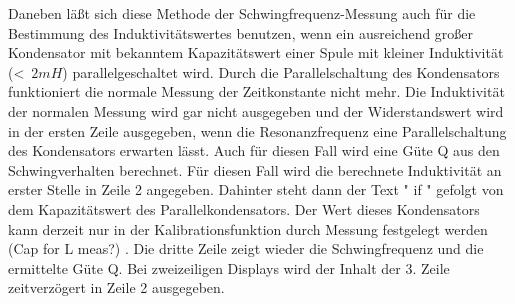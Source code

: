 Daneben läßt sich diese Methode der Schwingfrequenz-Messung auch für die Bestimmung des Induktivitätswertes benutzen,
wenn ein ausreichend großer Kondensator mit bekanntem Kapazitätswert einer Spule mit kleiner Induktivität (\textless~\(2mH\))
parallelgeschaltet wird. Durch die Parallelschaltung des Kondensators funktioniert die normale Messung der
Zeitkonstante nicht mehr. Die Induktivität der normalen Messung wird gar nicht ausgegeben und der
Widerstandswert wird in der ersten Zeile ausgegeben, wenn die Resonanzfrequenz eine Parallelschaltung
des Kondensators erwarten lässt. Auch für diesen Fall wird eine Güte Q aus den Schwingverhalten berechnet.
Für diesen Fall wird die berechnete Induktivität an erster Stelle in Zeile 2 angegeben. Dahinter steht dann
der Text " if " gefolgt von dem Kapazitätswert des Parallelkondensators. Der Wert dieses Kondensators kann derzeit
nur in der Kalibrationsfunktion durch Messung festgelegt werden (Cap for L meas?) .
Die dritte Zeile zeigt wieder die Schwingfrequenz und die ermittelte Güte Q. 
Bei zweizeiligen Displays wird der Inhalt der 3. Zeile zeitverzögert in Zeile 2 ausgegeben.

